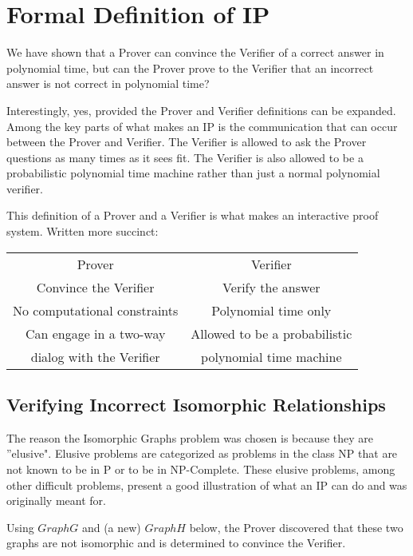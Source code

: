 \documentclass[12pt]{article}
\begin{document}
\section{Formal  Definition of IP}
We have shown that a Prover can convince the Verifier of a correct answer in polynomial time, but can the Prover prove to the Verifier that an incorrect answer is not correct in polynomial time?

Interestingly, yes, provided the Prover and Verifier definitions can be expanded. Among the key parts of what makes an IP is the communication that can occur between the Prover and Verifier. The Verifier is allowed to ask the Prover questions as many times as it sees fit. The Verifier is also allowed to be a probabilistic polynomial time machine rather than just a normal polynomial verifier.

This definition of a Prover and a Verifier is what makes an interactive proof system. Written more succinct:

\begin{center}
\begin{tabular}{ c c }
{\LARGE Prover} & {\LARGE Verifier} \\
Convince the Verifier & Verify the answer \\
No computational constraints & Polynomial time only \\
Can engage in a two-way & Allowed to be a probabilistic \\
dialog with the Verifier & polynomial time machine \\
\end{tabular}
\end{center}

\subsection{Verifying Incorrect Isomorphic Relationships}

The reason the Isomorphic Graphs problem was chosen is because they are ''elusive". Elusive problems are categorized as problems in the class NP that are not known to be in P or to be in NP-Complete. These elusive problems, among other difficult problems, present a good illustration of what an IP can do and was originally meant for.

Using $Graph G$ and (a new) $Graph H$ below, the Prover discovered that these two graphs are not isomorphic and is determined to convince the Verifier.
\end{document}
